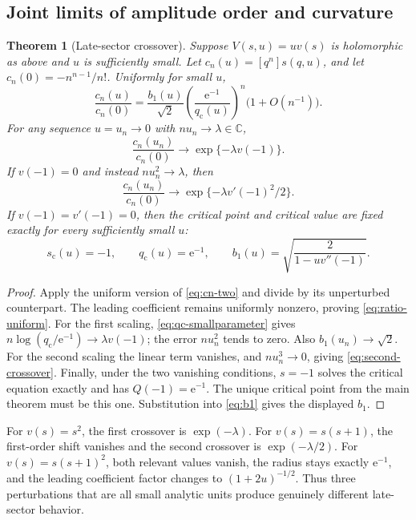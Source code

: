 \documentclass[11pt,a4paper]{article}
\numberwithin{equation}{section}
\newtheorem{theorem}{Theorem}[section]
\theoremstyle{definition}
\theoremstyle{remark}
\newcommand{\C}{\mathbb C}
\newcommand{\e}{\mathrm e}
\newcommand{\scv}{s_{\mathrm c}}
\newcommand{\qcv}{q_{\mathrm c}}
\begin{document}
\subsection{Joint limits of amplitude order and curvature}
\begin{theorem}[Late-sector crossover]
\label{thm:crossover}
Suppose $V(s,u)=u v(s)$ is holomorphic as above and $u$ is sufficiently small. Let $c_n(u)=[q^n]s(q,u)$, and let $c_n(0)=-n^{n-1}/n!$. Uniformly for small $u$,
\begin{equation}
 \frac{c_n(u)}{c_n(0)}=
 \frac{b_1(u)}{\sqrt2}
 \left(\frac{\e^{-1}}{\qcv(u)}\right)^n
 \bigl(1+O(n^{-1})\bigr).
 \label{eq:ratio-uniform}
\end{equation}
For any sequence $u=u_n\to0$ with $nu_n\to\lambda\in\C$,
\begin{equation}
 \frac{c_n(u_n)}{c_n(0)}\longrightarrow
          \exp\{-\lambda v(-1)\}.
 \label{eq:first-crossover}
\end{equation}
If $v(-1)=0$ and instead $nu_n^2\to\lambda$, then
\begin{equation}
 \frac{c_n(u_n)}{c_n(0)}\longrightarrow
     \exp\{-\lambda v'(-1)^2/2\}.
 \label{eq:second-crossover}
\end{equation}
If $v(-1)=v'(-1)=0$, then the critical point and critical value are fixed exactly for every sufficiently small $u$:
\begin{equation}
 \scv(u)=-1,\qquad \qcv(u)=\e^{-1},\qquad
 b_1(u)=\sqrt{\frac{2}{1-u v''(-1)}}.
 \label{eq:pinned-critical}
\end{equation}
\end{theorem}
\begin{proof}
Apply the uniform version of \eqref{eq:cn-two} and divide by its unperturbed counterpart. The leading coefficient remains uniformly nonzero, proving \eqref{eq:ratio-uniform}. For the first scaling, \eqref{eq:qc-smallparameter} gives
$n\log(\qcv/\e^{-1})\to\lambda v(-1)$; the error $nu_n^2$ tends to zero. Also $b_1(u_n)\to\sqrt2$. For the second scaling the linear term vanishes, and $nu_n^3\to0$, giving \eqref{eq:second-crossover}. Finally, under the two vanishing conditions, $s=-1$ solves the critical equation exactly and has $Q(-1)=\e^{-1}$. The unique critical point from the main theorem must be this one. Substitution into \eqref{eq:b1} gives the displayed $b_1$.
\end{proof}

For $v(s)=s^2$, the first crossover is $\exp(-\lambda)$. For $v(s)=s(s+1)$, the first-order shift vanishes and the second crossover is $\exp(-\lambda/2)$. For $v(s)=s(s+1)^2$, both relevant values vanish, the radius stays exactly $\e^{-1}$, and the leading coefficient factor changes to $(1+2u)^{-1/2}$. Thus three perturbations that are all small analytic units produce genuinely different late-sector behavior.
\end{document}
